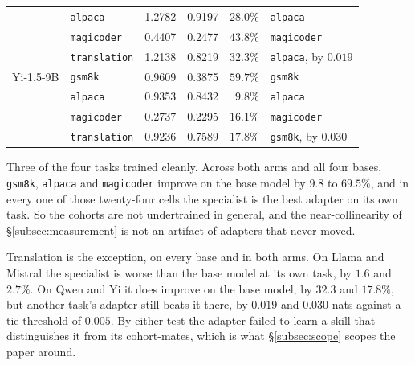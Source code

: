 \begin{table}[tb]
\begin{tabular}{llccrl}
             & \texttt{alpaca}      & 1.2782 & 0.9197 & $28.0\%$ & \texttt{alpaca} \\
             & \texttt{magicoder}   & 0.4407 & 0.2477 & $43.8\%$ & \texttt{magicoder} \\
             & \texttt{translation} & 1.2138 & 0.8219 & $32.3\%$ & \texttt{alpaca}, by $0.019$ \\
\addlinespace
Yi-1.5-9B    & \texttt{gsm8k}       & 0.9609 & 0.3875 & $59.7\%$ & \texttt{gsm8k} \\
             & \texttt{alpaca}      & 0.9353 & 0.8432 & $9.8\%$  & \texttt{alpaca} \\
             & \texttt{magicoder}   & 0.2737 & 0.2295 & $16.1\%$ & \texttt{magicoder} \\
             & \texttt{translation} & 0.9236 & 0.7589 & $17.8\%$ & \texttt{gsm8k}, by $0.030$ \\
\bottomrule
\end{tabular}
\end{table}

Three of the four tasks trained cleanly. Across both arms and all four
bases, \texttt{gsm8k}, \texttt{alpaca} and \texttt{magicoder} improve on
the base model by $9.8$ to $69.5\%$, and in every one of those
twenty-four cells the specialist is the best adapter on its own task. So
the cohorts are not undertrained in general, and the near-collinearity of
\S\ref{subsec:measurement} is not an artifact of adapters that never
moved.

Translation is the exception, on every base and in both arms. On Llama and
Mistral the specialist is worse than the base model at its own task, by
$1.6$ and $2.7\%$. On Qwen and Yi it does improve on the base model, by
$32.3$ and $17.8\%$, but another task's adapter still beats it there, by
$0.019$ and $0.030$ nats against a tie threshold of $0.005$. By either
test the adapter failed to learn a skill that distinguishes it from its
cohort-mates, which is what \S\ref{subsec:scope} scopes the paper around.

